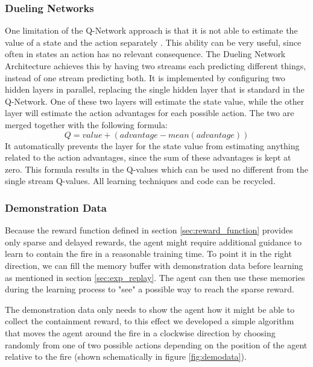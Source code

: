 


\subsubsection{Dueling Networks}\label{sec:dueling}
One limitation of the Q-Network approach is that it is not able to estimate the value of a state and the action separately \citep{wang2015dueling}. This ability can be very useful, since often in states an action has no relevant consequence. The Dueling Network Architecture achieves this by having two streams each predicting different things, instead of one stream predicting both. It is implemented by configuring two hidden layers in parallel, replacing the single hidden layer that is standard in the Q-Network. One of these two layers will estimate the state value, while the other layer will estimate the action advantages for each possible action. The two are merged together with the following formula:
$$ Q = value + (advantage - mean(advantage))$$
It automatically prevents the layer for the state value from estimating anything related to the action advantages, since the sum of these advantages is kept at zero. This formula results in the Q-values which can be used no different from the single stream Q-values. All learning techniques and code can be recycled.



\subsubsection{Demonstration Data}\label{sec:demo_data}
Because the reward function defined in section \ref{sec:reward_function} provides only sparse and delayed rewards, the agent might require additional guidance to learn to contain the fire in a reasonable training time. To point it in the right direction, we can fill the memory buffer with demonstration data before learning as mentioned in section \ref{sec:exp_replay}. The agent can then use these memories during the learning process to "see" a possible way to reach the sparse reward.

The demonstration data only needs to show the agent how it might be able to collect the containment reward, to this effect we developed a simple algorithm that moves the agent around the fire in a clockwise direction by choosing randomly from one of two possible actions depending on the position of the agent relative to the fire (shown schematically in figure \ref{fig:demodata}). 


